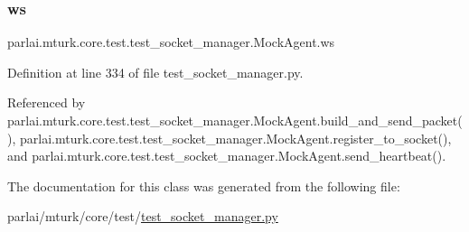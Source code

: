 \subsubsection{\texorpdfstring{ws}{ws}}
{\footnotesize\ttfamily parlai.\+mturk.\+core.\+test.\+test\+\_\+socket\+\_\+manager.\+Mock\+Agent.\+ws}



Definition at line 334 of file test\+\_\+socket\+\_\+manager.\+py.



Referenced by parlai.\+mturk.\+core.\+test.\+test\+\_\+socket\+\_\+manager.\+Mock\+Agent.\+build\+\_\+and\+\_\+send\+\_\+packet(), parlai.\+mturk.\+core.\+test.\+test\+\_\+socket\+\_\+manager.\+Mock\+Agent.\+register\+\_\+to\+\_\+socket(), and parlai.\+mturk.\+core.\+test.\+test\+\_\+socket\+\_\+manager.\+Mock\+Agent.\+send\+\_\+heartbeat().



The documentation for this class was generated from the following file\+:\begin{DoxyCompactItemize}
\item 
parlai/mturk/core/test/\hyperlink{test_2test__socket__manager_8py}{test\+\_\+socket\+\_\+manager.\+py}\end{DoxyCompactItemize}
